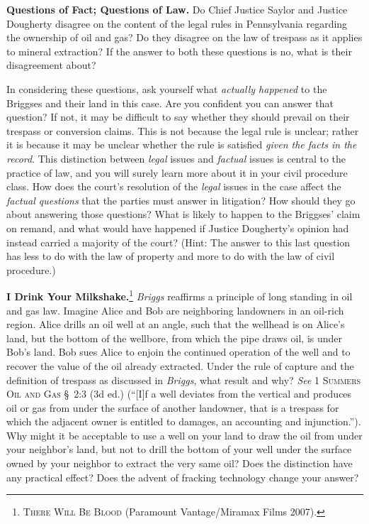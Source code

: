 
\item \textbf{Questions of Fact; Questions of Law.} Do Chief Justice Saylor and
Justice Dougherty disagree on the content of the legal rules in Pennsylvania
regarding the ownership of oil and gas? Do they disagree on the law of trespass
as it applies to mineral extraction? If the answer to both these questions is
no, what is their disagreement about?

In considering these questions, ask yourself what \textit{actually happened} to
the Briggses and their land in this case. Are you confident you can answer that
question? If not, it may be difficult to say whether they should prevail on
their trespass or conversion claims. This is not because the legal rule is
unclear; rather it is because it may be unclear whether the rule is satisfied
\textit{given the facts in the record}. This distinction between \textit{legal}
issues and \textit{factual} issues is central to the practice of law, and you
will surely learn more about it in your civil procedure class. How does the
court's resolution of the \textit{legal} issues in the case affect the
\textit{factual questions} that the parties must answer in litigation? How
should they go about answering those questions? What is likely to happen to the
Briggses' claim on remand, and what would have happened if Justice Dougherty's
opinion had instead carried a majority of the court? (Hint: The answer to this
last question has less to do with the law of property and more to do with the
law of civil procedure.)


\item \textbf{I Drink Your Milkshake.}\footnote{\textsc{There Will Be Blood}
(Paramount Vantage/Miramax Films 2007).} \textit{Briggs} reaffirms a principle
of long standing in oil and gas law. Imagine Alice and Bob are neighboring
landowners in an oil-rich region. Alice drills an oil well at an angle, such
that the wellhead is on Alice's land, but the bottom of the wellbore, from which
the pipe draws oil, is under Bob's land. Bob sues Alice to enjoin the continued
operation of the well and to recover the value of the oil already extracted.
Under the rule of capture and the definition of trespass as discussed in
\textit{Briggs}, what result and why? \textit{See} 1 \textsc{Summers}
\textsc{Oil and Gas} \S~2:3 (3d ed.) (``[I]f a well deviates from the vertical
and produces oil or gas from under the surface of another landowner, that is a
trespass for which the adjacent owner is entitled to damages, an accounting and
injunction.''). Why might it be acceptable to use a well on your land to draw
the oil from under your neighbor's land, but not to drill the bottom of your
well under the surface owned by your neighbor to extract the very same oil? Does
the distinction have any practical effect? Does the advent of fracking
technology change your answer?



